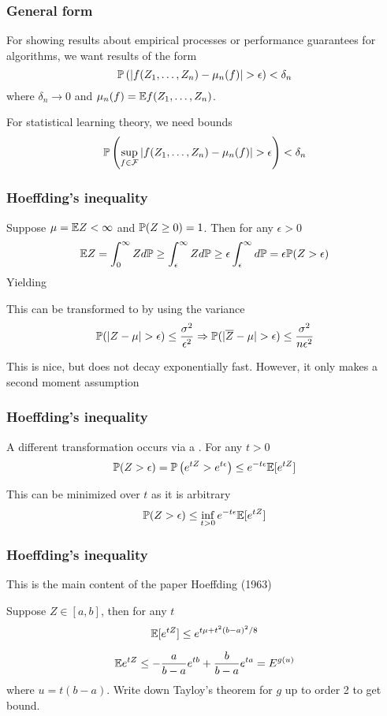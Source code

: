 \documentclass[12pt]{beamer}
\begin{document}

\begin{frame}[fragile]
\frametitle{General form}
For showing results about empirical processes or performance guarantees for algorithms, we want results of the form
\[
\P\left(|f(Z_1,\ldots,Z_n) - \mu_n(f)| > \epsilon\right) < \delta_n
\]
where $\delta_n\rightarrow 0$ and $\mu_n(f) = \E f(Z_1,\ldots,Z_n)$.

\vsp
For statistical learning theory, we need  bounds
\[
\P\left(\sup_{f \in \F} |f(Z_1,\ldots,Z_n) - \mu_n(f)| > \epsilon\right) < \delta_n
\]

\end{frame}

\begin{frame}[fragile]
\frametitle{Hoeffding's inequality}
Suppose $\mu = \E Z < \infty$ and $\P(Z \geq 0) = 1$.  Then for any $\epsilon > 0$
\[
\E Z = \int_0^\infty Z d\P \geq \int_\epsilon^\infty Z d\P \geq \epsilon \int_\epsilon^\infty  d\P = \epsilon \P(Z > \epsilon)
\]
Yielding 

\vsp
This can be transformed to  by using the variance
\[
\P(|Z - \mu| > \epsilon) \leq \frac{\sigma^2}{\epsilon^2} \Rightarrow \P(|\overline{Z} - \mu| > \epsilon) \leq \frac{\sigma^2}{n\epsilon^2}
\]

 This is nice, but does not decay exponentially fast.  However, it only makes a second moment
assumption
\end{frame}

\begin{frame}[fragile]
\frametitle{Hoeffding's inequality}
A different transformation occurs via a .  For any $t > 0$
\[
\P(Z > \epsilon) = \P\left( e^{tZ} > e^{t\epsilon}\right) \leq e^{-t\epsilon}\E[e^{tZ}]
\]

\vsp
This can be minimized over $t$ as it is arbitrary
\[
\P(Z > \epsilon)  \leq \inf_{t > 0} e^{-t\epsilon}\E[e^{tZ}]
\]
\end{frame}

\begin{frame}[fragile]
\frametitle{Hoeffding's inequality}
This is the main content of the paper Hoeffding (1963)

\vsp
{}
 Suppose $Z \in [a,b]$, then for any $t$
\[
\E[e^{tZ}] \leq e^{t\mu + t^2(b-a)^2/8}
\]

\vsp
{} 
\[
\E e^{tZ} \leq -\frac{a}{b-a}e^{tb} + \frac{b}{b-a}e^{ta} = E^{g(u)}
\]
where $u = t(b-a)$. Write down Tayloy's theorem for $g$ up to order 2 to get bound.

\end{frame}
\end{document}

